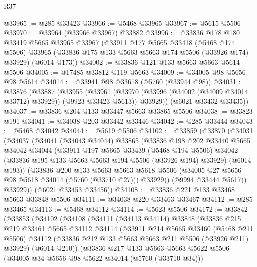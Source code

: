 \begin{lexlean}{R37}
\begin{coremodule}
@33965 := @285 @33423
@33966 := @5468 @33965
@33967 := @5615 @5506
@33970 := @33964 (@33966 @33967) @33882
@33996 := @33836
    @178
    @180
    @33419
    @5665
    @33965
    @33967
    (@33911
      @177
      @5665
      @33418
      (@5468 @174 @5506)
      @33965
      (@33836 @175 @133 @5663 @5663 @174 @5506 (@33926 @174) @33929)
      (@6014 @173))
@34002 := @33836 @121 @133 @5663 @5663 @5614 @5506
@34005 := @17485 @33812 @119 @5663
@34009 := @34005 @98 @5656 @98 @5614
@34014 := @33941 @98 @33618 (@5760 (@33944 @98))
@34031 := @33876
    (@33887
      (@33955
        (@33961
          (@33970 (@33996 (@34002 (@34009 @34014 @33712) @33929)) (@9923 @33423 @5613))
          @33929))
      (@6021 @33432 @33435))
@34037 := @33836 @204 @133 @33447 @5663 @33865 @5506
@34038 := @33823 @191
@34041 := @34038 @203 @33442 @33446
@34042 := @285 @33444
@34043 := @5468 @34042
@34044 := @5619 @5506
@34102 := @33859
    (@33870
      (@34031
        (@34037
          (@34041
            (@34043 @34044)
            @33865
            (@33836
              @198
              @202
              @33440
              @5665
              @34042
              @34044
              (@33911
                @197
                @5665
                @33439
                (@5468 @194 @5506)
                @34042
                (@33836 @195 @133 @5663 @5663 @194 @5506 (@33926 @194) @33929)
                (@6014 @193))
              (@33836
                @200
                @133
                @5663
                @5663
                @5618
                @5506
                (@34005 @27 @5656 @98 @5618 @34014 (@5760 (@33710 @27)))
                @33929))
            (@9994 @33444 @5617))
          @33929))
      (@6021 @33453 @33456))
@34108 := @33836 @221 @133 @33468 @5663 @33848 @5506
@34111 := @34038 @220 @33463 @33467
@34112 := @285 @33465
@34113 := @5468 @34112
@34114 := @5623 @5506
@34172 := @33842
    (@33853
      (@34102
        (@34108
          (@34111
            (@34113 @34114)
            @33848
            (@33836
              @215
              @219
              @33461
              @5665
              @34112
              @34114
              (@33911
                @214
                @5665
                @33460
                (@5468 @211 @5506)
                @34112
                (@33836 @212 @133 @5663 @5663 @211 @5506 (@33926 @211) @33929)
                (@6014 @210))
              (@33836
                @217
                @133
                @5663
                @5663
                @5622
                @5506
                (@34005 @34 @5656 @98 @5622 @34014 (@5760 (@33710 @34)))

\end{coremodule}
\end{lexlean}
